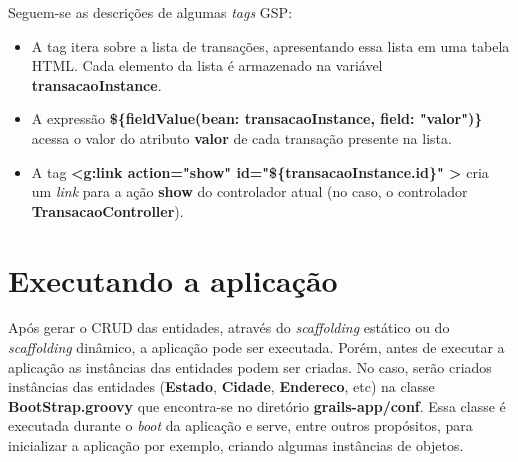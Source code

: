 \vspace{0.2cm}

Seguem-se as descrições de algumas {\it tags} GSP:

\vspace{0.2cm}

\begin{cBox}
\begin{itemize}

\item A tag {\bf <g:each>} itera  sobre a lista de transações, apresentando essa
  lista em uma tabela HTML. Cada elemento da lista é armazenado na variável {\bf
    transacaoInstance}.  

\vspace{0.2cm}

\item   A   expressão   {\bf  \$\{fieldValue(bean:   transacaoInstance,   field:
  "valor")\}} acessa o valor do  atributo {\bf valor} de cada transação presente
  na lista.  

\vspace{0.2cm}

\item      A     tag      {\bf     <g:link      action="show"     \hspace{0.2cm}
  id="\$\{transacaoInstance.id\}"  \hspace{0.1cm}>} cria  um {\it  link}  para a
  ação  {\bf   show}  do  controlador   atual  (no  caso,  o   controlador  {\bf
    TransacaoController}).  
\end{itemize}

\end{cBox}

\section{Executando a aplicação}

\vspace{0.5cm}

Após gerar  o CRUD das  entidades, através do  {\it scaffolding} estático  ou do
{\it  scaffolding} dinâmico,  a aplicação  pode ser  executada. Porém,  antes de
executar a  aplicação as  instâncias das entidades  podem ser criadas.  No caso,
serão  criados  instâncias  das  entidades  ({\bf Estado},  {\bf  Cidade},  {\bf
  Endereco}, etc) na classe  {\bf BootStrap.groovy} que encontra-se no diretório
{\bf grails-app/conf}. Essa classe é executada durante o {\it boot} da aplicação
e  serve, entre  outros propósitos,  para inicializar  a aplicação  por exemplo,
criando algumas instâncias de objetos.

